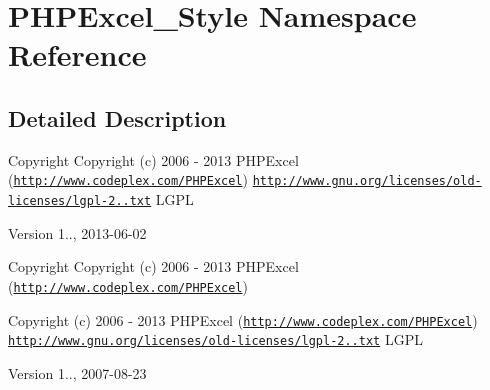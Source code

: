 \hypertarget{namespacePHPExcel__Style}{}\section{P\+H\+P\+Excel\+\_\+\+Style Namespace Reference}
\label{namespacePHPExcel__Style}


\subsection{Detailed Description}
\begin{DoxyCopyright}{Copyright}
Copyright (c) 2006 -\/ 2013 P\+H\+P\+Excel (\href{http://www.codeplex.com/PHPExcel}{\tt http\+://www.\+codeplex.\+com/\+P\+H\+P\+Excel})  \href{http://www.gnu.org/licenses/old-licenses/lgpl-2.1.txt}{\tt http\+://www.\+gnu.\+org/licenses/old-\/licenses/lgpl-\/2..\+txt} L\+G\+PL 
\end{DoxyCopyright}
\begin{DoxyVersion}{Version}
1.., 2013-\/06-\/02
\end{DoxyVersion}
\begin{DoxyCopyright}{Copyright}
Copyright (c) 2006 -\/ 2013 P\+H\+P\+Excel (\href{http://www.codeplex.com/PHPExcel}{\tt http\+://www.\+codeplex.\+com/\+P\+H\+P\+Excel})

Copyright (c) 2006 -\/ 2013 P\+H\+P\+Excel (\href{http://www.codeplex.com/PHPExcel}{\tt http\+://www.\+codeplex.\+com/\+P\+H\+P\+Excel})  \href{http://www.gnu.org/licenses/old-licenses/lgpl-2.1.txt}{\tt http\+://www.\+gnu.\+org/licenses/old-\/licenses/lgpl-\/2..\+txt} L\+G\+PL 
\end{DoxyCopyright}
\begin{DoxyVersion}{Version}
1.., 2007-\/08-\/23 
\end{DoxyVersion}
